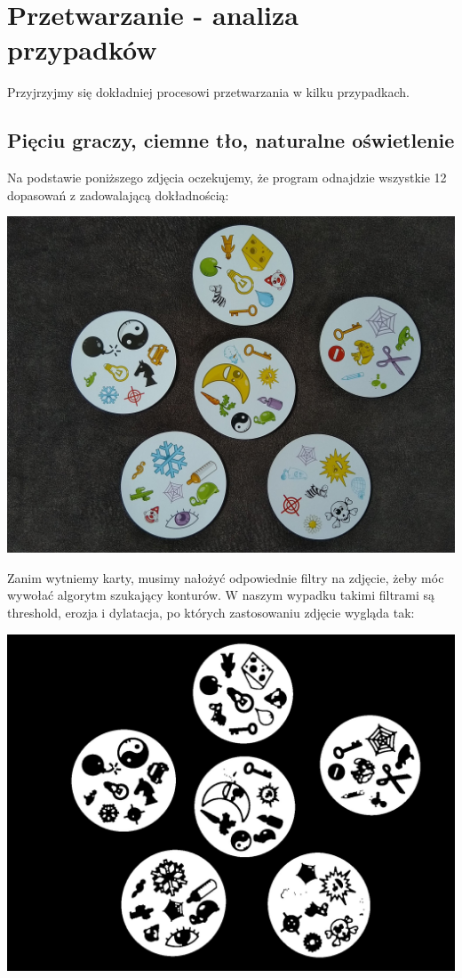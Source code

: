 \documentclass[10pt,a4paper]{article}
\begin{document}
\newpage

\section{Przetwarzanie - analiza przypadków}
Przyjrzyjmy się dokładniej procesowi przetwarzania w kilku przypadkach.
\subsection{Pięciu graczy, ciemne tło, naturalne oświetlenie}
Na podstawie poniższego zdjęcia oczekujemy, że program odnajdzie wszystkie 12 dopasowań z zadowalającą dokładnością:\\
\begin{center}
\includegraphics[scale=0.25]{2.1/dobble04.jpg}
\end{center}
Zanim wytniemy karty, musimy nałożyć odpowiednie filtry na zdjęcie, żeby móc wywołać algorytm szukający konturów. W naszym wypadku takimi filtrami są threshold, erozja i dylatacja, po których zastosowaniu zdjęcie wygląda tak:\\
\begin{center}
\includegraphics[scale=0.20]{2.1/th1.jpg}
\end{center}
\end{document}
